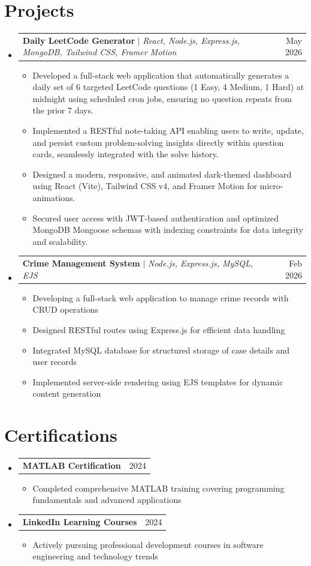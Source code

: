 \documentclass[letterpaper,11pt]{article}
\makeatletter
\newcommand{\resumeItem}[1]{
  \item\small{
    {#1 \vspace{-2pt}}
  }
}
\newcommand{\resumeProjectHeading}[2]{
    \item
    \begin{tabular*}{0.97\textwidth}{l@{\extracolsep{\fill}}r}
      \small#1 & #2 \\
    \end{tabular*}\vspace{-7pt}
}
\newcommand{\resumeSubHeadingListStart}{\begin{itemize}[leftmargin=0.15in, label={}]}
\newcommand{\resumeSubHeadingListEnd}{\end{itemize}}
\newcommand{\resumeItemListStart}{\begin{itemize}}
\newcommand{\resumeItemListEnd}{\end{itemize}\vspace{-5pt}}
\makeatother
\begin{document}
\section{Projects}
    \resumeSubHeadingListStart
      \resumeProjectHeading
          {\textbf{Daily LeetCode Generator} $|$ \emph{React, Node.js, Express.js, MongoDB, Tailwind CSS, Framer Motion}}{May 2026}
          \resumeItemListStart
            \resumeItem{Developed a full-stack web application that automatically generates a daily set of 6 targeted LeetCode questions (1 Easy, 4 Medium, 1 Hard) at midnight using scheduled cron jobs, ensuring no question repeats from the prior 7 days.}
            \resumeItem{Implemented a RESTful note-taking API enabling users to write, update, and persist custom problem-solving insights directly within question cards, seamlessly integrated with the solve history.}
            \resumeItem{Designed a modern, responsive, and animated dark-themed dashboard using React (Vite), Tailwind CSS v4, and Framer Motion for micro-animations.}
            \resumeItem{Secured user access with JWT-based authentication and optimized MongoDB Mongoose schemas with indexing constraints for data integrity and scalability.}
          \resumeItemListEnd
      \resumeProjectHeading
          {\textbf{Crime Management System} $|$ \emph{Node.js, Express.js, MySQL, EJS}}{Feb 2026}
          \resumeItemListStart
            \resumeItem{Developing a full-stack web application to manage crime records with CRUD operations}
            \resumeItem{Designed RESTful routes using Express.js for efficient data handling}
            \resumeItem{Integrated MySQL database for structured storage of case details and user records}
            \resumeItem{Implemented server-side rendering using EJS templates for dynamic content generation}
          \resumeItemListEnd
    \resumeSubHeadingListEnd

\section{Certifications}
    \resumeSubHeadingListStart
      \resumeProjectHeading
          {\textbf{MATLAB Certification}}{2024}
          \resumeItemListStart
            \resumeItem{Completed comprehensive MATLAB training covering programming fundamentals and advanced applications}
          \resumeItemListEnd
      \resumeProjectHeading
          {\textbf{LinkedIn Learning Courses}}{2024}
          \resumeItemListStart
            \resumeItem{Actively pursuing professional development courses in software engineering and technology trends}
          \resumeItemListEnd
    \resumeSubHeadingListEnd
\end{document}
